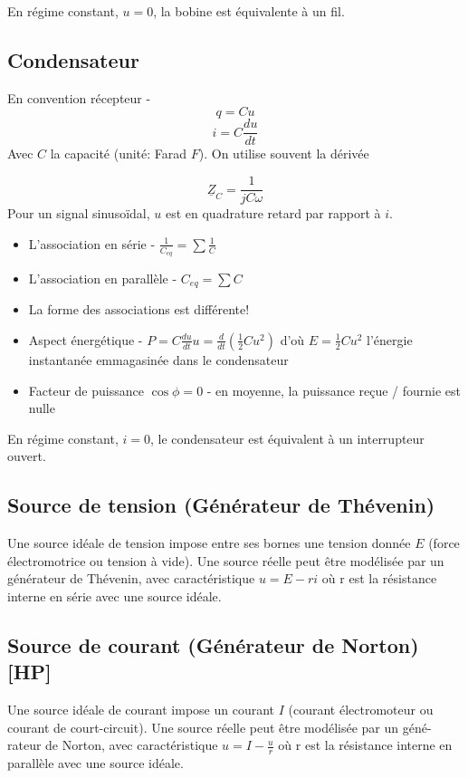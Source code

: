 \documentclass[openany]{book}
\begin{document}
\noindent En régime constant, $u = 0$, la bobine est équivalente à un fil. 

\subsection{Condensateur}
En convention récepteur - 
\[ q = Cu \]
\[ i = C\frac{du}{dt} \]
Avec $C$ la capacité (unité: Farad $F$). On utilise souvent la dérivée

\[\underline{Z}_C = \frac{1}{jC\omega} \]
\noindent Pour un signal sinusoïdal, $u$ est en quadrature retard par rapport à $i$.

\begin{itemize}
    \item L'association en série - $\frac{1}{C_{eq}}=\sum \frac{1}{C}$
    \item L'association en parallèle - $C_{eq}=\sum C$
    \item La forme des associations est différente!
    \item Aspect énergétique - $ P = C\frac{du}{dt}u=\frac{d}{dt}(\frac{1}{2}Cu^2) $ d'où $ E = \frac{1}{2}Cu^2 $ l'énergie instantanée emmagasinée dans le condensateur
    \item Facteur de puissance $\cos{\phi} = 0$ - en moyenne, la puissance reçue / fournie est nulle
\end{itemize}

\noindent En régime constant, $i = 0$, le condensateur est équivalent à un interrupteur ouvert. 

\subsection{Source de tension (Générateur de Thévenin)}
Une source idéale de tension impose entre ses bornes une tension donnée $E$ (force électromotrice ou tension à vide). Une source réelle peut être modélisée par un générateur de Thévenin, avec caractéristique $u=E-ri$ où r est la résistance interne en série avec une source idéale. 

\subsection{Source de courant (Générateur de Norton) [HP]}
Une source idéale de courant impose un courant $I$ (courant électromoteur ou courant de court-circuit). Une source réelle peut être modélisée par un géné-rateur de Norton, avec caractéristique $u=I-\frac{u}{r}$ où r est la résistance interne en parallèle avec une source idéale. \\
\end{document}
